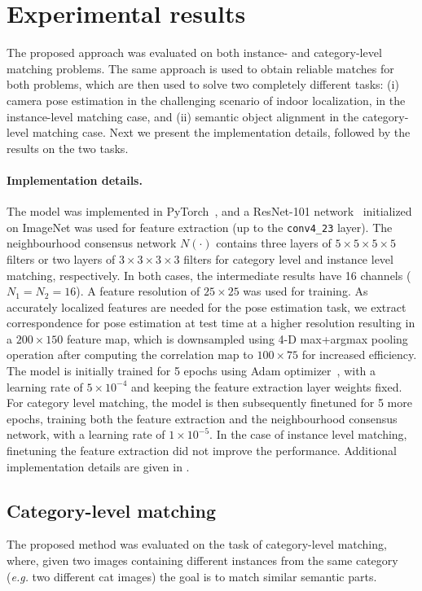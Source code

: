 \documentclass{article}
\begin{document}
\section{Experimental results}
The proposed approach was evaluated on both instance- and category-level matching problems. The same approach is used to obtain reliable matches for both problems, which are then used to solve two completely different tasks: (i) camera pose estimation in the challenging scenario of indoor localization, in the instance-level matching case, and (ii) semantic object alignment in the category-level matching case. Next we present the implementation details, followed by the results on the two tasks. 

\paragraph{Implementation details.}
The model was implemented in PyTorch~\cite{pytorch}, and a ResNet-101 network~\cite{he2016deep} initialized on ImageNet was used for feature extraction (up to the \texttt{conv4\_23} layer). The neighbourhood consensus network $N(\cdot)$ contains three layers of $5\times 5\times 5\times 5$ filters or two layers of $3\times 3\times 3\times 3$ filters for category level and instance level matching, respectively. In both cases, the intermediate results have 16 channels ($N_1=N_2=16$).
A feature resolution of $25\times 25$ was used for training. As accurately localized features are needed for the pose estimation task, we extract correspondence for pose estimation at test time at a higher resolution resulting in a $200\times 150$ feature map, which is downsampled using 4-D max+argmax pooling operation after computing the correlation map to $100\times 75$ for increased efficiency.
The model is initially trained for 5 epochs using Adam optimizer~\cite{kingma2015adam}, with a learning rate of $5 \times 10^{-4}$ and keeping the feature extraction layer weights fixed. 
For category level matching, the model is then subsequently finetuned for 5 more epochs, training both the feature extraction and the neighbourhood consensus network, with a learning rate of $1 \times 10^{-5}$. In the case of instance level matching, finetuning the feature extraction did not improve the performance. Additional implementation details are given in .


\subsection{Category-level matching}
The proposed method was evaluated on the task of category-level matching, where, given two images containing different instances from the same category (\emph{e.g.} two different cat images) the goal is to match similar semantic parts. 
\end{document}
